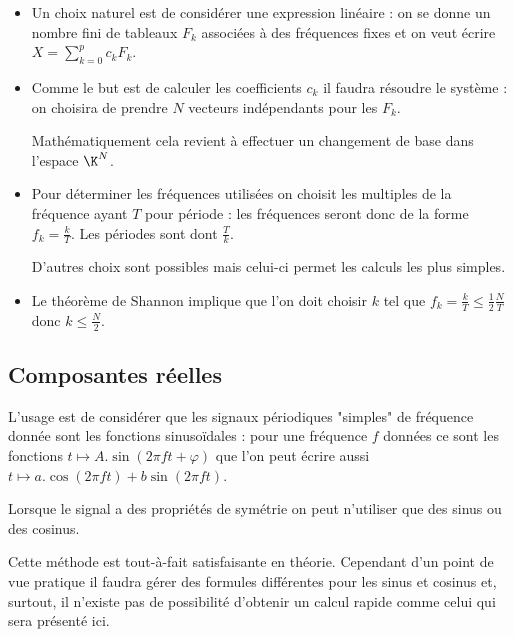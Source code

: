 \begin{itemize}
\item Un choix naturel est de considérer une expression linéaire : on se donne un nombre fini de tableaux $F_k$
associées à des fréquences fixes et on veut écrire $\displaystyle X =\sum_{k=0}^p c_kF_k$.

\item Comme le but est de calculer les coefficients $c_k$ il faudra résoudre le système : on choisira de prendre $N$
vecteurs indépendants pour les $F_k$. 

Mathématiquement cela revient à effectuer un changement de base dans l'espace $\K^N$.

\item Pour déterminer les fréquences utilisées on choisit les multiples de la fréquence ayant $T$ pour période : les
fréquences seront donc de la forme $f_k= \frac kT$. Les périodes sont dont $\frac Tk$.

D'autres choix sont possibles mais celui-ci permet les calculs les plus simples.

\item Le théorème de Shannon implique que l'on doit choisir $k$ tel que $f_k = \frac kT\le \frac 12\frac NT$ donc $k \le \frac N2$.
\end{itemize}
\newpage
\subsection{Composantes réelles}
L'usage est de considérer que les signaux périodiques "simples" de fréquence donnée sont les fonctions sinusoïdales : pour une fréquence $f$ données ce sont les fonctions $t\mapsto A.\sin(2\pi f t + \varphi)$ que l'on peut écrire aussi
$t\mapsto a.\cos(2\pi f t) + b\sin(2\pi f t)$.

Lorsque le signal a des propriétés de symétrie on peut n'utiliser que des sinus ou des cosinus.

Cette méthode est tout-à-fait satisfaisante en théorie. Cependant d'un point de vue pratique il faudra gérer des formules différentes pour les sinus et cosinus et, surtout, il n'existe pas de possibilité d'obtenir un calcul rapide comme celui qui sera présenté ici.
